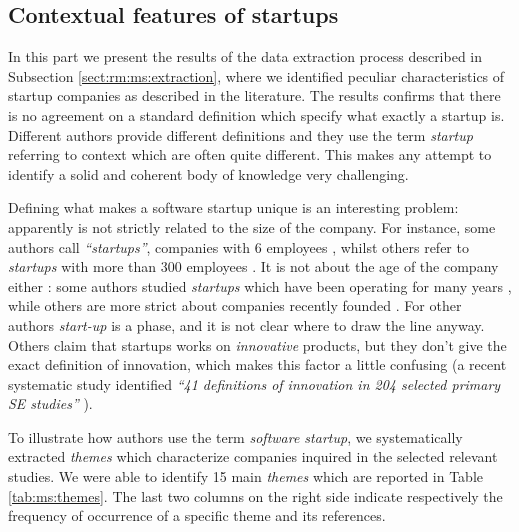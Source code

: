 \documentclass[final,5p,times,twocolumn]{elsarticle}
\begin{document}

\subsection{Contextual features of startups} %
\label{sub:contextual_features_of_startups}
In this part we present the results of the data extraction process described in Subsection \ref{sect:rm:ms:extraction}, where we identified peculiar characteristics of startup companies as described in the literature. The results confirms that there is no agreement on a standard definition which specify what exactly a startup is. Different authors provide different definitions and they use the term \textit{startup} referring to context which are often quite different. This makes any attempt to identify a solid and coherent body of knowledge very challenging.

Defining what makes a software startup unique is an interesting problem: apparently is not strictly related to the size of the company. For instance, some authors call \textit{“startups”}, companies with 6 employees \cite{Mirel2000}, whilst others refer to \textit{startups} with more than 300 employees \cite{Yoffie1999,Coleman2008}. It is not about the age of the company either : some authors studied \textit{startups} which have been operating for many years \cite{Lai2010}, while others are more strict about companies recently founded \cite{Kajko-Mattsson2008}. For other authors \textit{start-up} is a phase, and it is not clear where to draw the line anyway. Others claim that startups works on \textit{innovative} products, but they don’t give  the exact definition of innovation, which makes this factor a little confusing (a recent systematic study identified  \textit{``41 definitions of innovation in 204 selected primary SE studies''} \cite{Ali2010a}).

To illustrate how authors use the term \textit{software startup}, we systematically extracted \textit{themes} which characterize companies inquired in the selected relevant studies. We were able to identify 15 main \textit{themes} which are reported in Table \ref{tab:ms:themes}. The last two columns on the right side indicate respectively the frequency of occurrence of a specific theme and its references.
\end{document}
